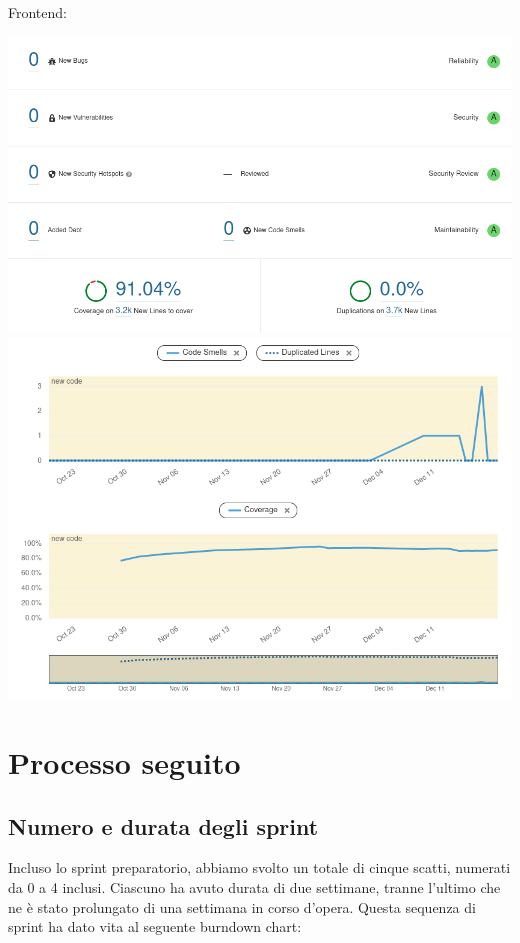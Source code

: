 \documentclass{article}
\begin{document}
Frontend:

\includegraphics[width=\textwidth]{quality-frontend-overall}
\includegraphics[width=\textwidth]{quality-frontend-activity}

\section{Processo seguito}

\subsection{Numero e durata degli sprint}

Incluso lo sprint preparatorio, abbiamo svolto un totale di cinque scatti,
numerati da 0 a 4 inclusi. Ciascuno ha avuto durata di due settimane, tranne
l'ultimo che ne è stato prolungato di una settimana in corso d'opera. Questa
sequenza di sprint ha dato vita al seguente burndown chart:
\end{document}
